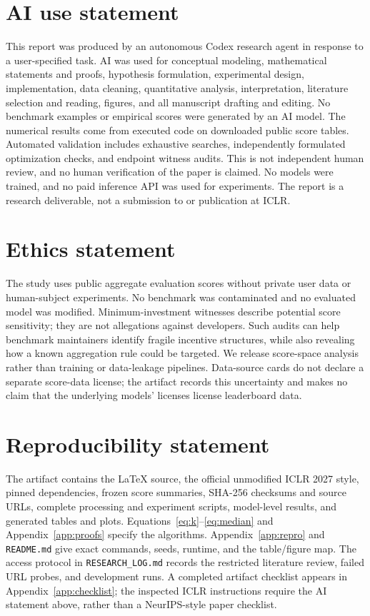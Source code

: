 \documentclass{article}
\begin{document}
\clearpage
\section*{AI use statement}
This report was produced by an autonomous Codex research agent in response to a
user-specified task. AI was used for conceptual modeling, mathematical statements
and proofs, hypothesis formulation, experimental design, implementation, data
cleaning, quantitative analysis, interpretation, literature selection and reading,
figures, and all manuscript drafting and editing. No benchmark examples or
empirical scores were generated by an AI model. The numerical results come from
executed code on downloaded public score tables. Automated validation includes
exhaustive searches, independently formulated optimization checks, and endpoint
witness audits. This is not independent human review, and no human verification
of the paper is claimed. No models were trained, and no paid inference API was
used for experiments. The report is a research deliverable, not a submission to
or publication at ICLR.

\section*{Ethics statement}
The study uses public aggregate evaluation scores without private user data or
human-subject experiments. No benchmark was contaminated and no evaluated model
was modified. Minimum-investment witnesses describe potential score sensitivity;
they are not allegations against developers. Such audits can help benchmark
maintainers identify fragile incentive structures, while also revealing how a
known aggregation rule could be targeted. We release score-space analysis rather
than training or data-leakage pipelines. Data-source cards do not declare a separate
score-data license; the artifact records this uncertainty and makes no claim that
the underlying models' licenses license leaderboard data.

\section*{Reproducibility statement}
The artifact contains the LaTeX source, the official unmodified ICLR 2027 style,
pinned dependencies, frozen score summaries, SHA-256 checksums and source URLs,
complete processing and experiment scripts, model-level results, and generated
tables and plots. Equations~\ref{eq:k}--\ref{eq:median} and
Appendix~\ref{app:proofs} specify the algorithms. Appendix~\ref{app:repro} and
\texttt{README.md} give exact commands, seeds, runtime, and the table/figure map.
The access protocol in \texttt{RESEARCH\_LOG.md} records the restricted literature
review, failed URL probes, and development runs. A completed artifact checklist
appears in Appendix~\ref{app:checklist}; the inspected ICLR instructions require
the AI statement above, rather than a NeurIPS-style paper checklist.
\end{document}
